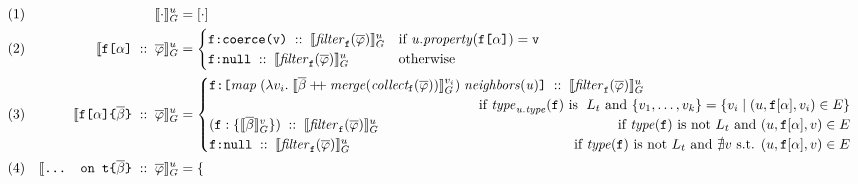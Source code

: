 
\begin{figure}[t]
\small
    \centering
    \begin{align*}
    & (1) & \eval{\cdot}{u} &= [\cdot] \\
    & (2) & \evalu{\fld\; ::\; \queries} &= \begin{cases}
        \resp{\texttt{coerce(\val)}} \; ::\; \evalfilteru{\queries}{\fkey}  
        & \text{if } \mathit{u.property}(\fld) = \val \\
        \resp{\nval} \; :: \; \evalfilteru{\queries}{\fkey} 
        & \text{otherwise}
    \end{cases}\\
    & (3) & \evalu{\nfld{\overline{\beta}} \; ::\; \queries} &=
    \begin{cases}
        \resp{\texttt{[} \mathit{map}\; (\lambda v_{i}.\; \eval{\overline{\beta} \mdoubleplus \mathit{merge (collect_\fkey (\queries))}}{v_{i}})\; \mathit{neighbors(u)} \texttt{]}} \; :: \; \evalfilteru{\queries}{\fkey} \\  
        \hfill \text{ if } 
            \mathit{type}_{\mathit{u.type}}(\fkey) \text{ is } \; L_{t} \text{ and } \{v_{1}, \ldots, v_{k}\} = 
        \{v_{i} \mid (u, \fkey[\alpha], v_{i}) \in E\} \\
    (\fkey:\{\eval{\subqueries{\beta}}{v}\})\; :: \; \evalfilteru{\queries}{\fkey}  
        \hfill \text{ if } 
        \mathit{type(\fkey)} \text{ is not } L_{t} \text{ and } (u, \fkey[\alpha], v) \in E \\
    \resp{\nval}\; :: \; \evalfilteru{\queries}{\fkey} 
    \qquad \qquad \qquad \qquad \qquad \qquad \qquad \qquad
    \text{ if } \mathit{type(\fkey)} \text{ is not } L_{t}  \text{ and } \nexists v \text{ s.t. }  (u, \fkey[\alpha], v) \in E \\
    \end{cases}\\
    & (4) & \evalu{\ifrag{t}{\overline{\beta}}\; ::\; \queries} &= \begin{cases}

\end{cases}
\end{align*}
\end{figure}

